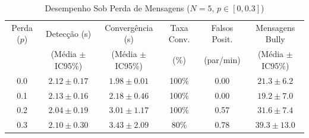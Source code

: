 \begin{table}[htbp]
\caption{Desempenho Sob Perda de Mensagens ($N=5$, $p \in [0, 0.3]$)}
\label{tab:grade_perda}
\centering
\small
\begin{tabular}{@{}cccccc@{}}
\toprule
Perda ($p$) & Detecção (s) & Convergência (s) & Taxa Conv. & Falsos Posit. & Mensagens Bully \\
 & (Média $\pm$ IC95\%) & (Média $\pm$ IC95\%) & (\%) & (par/min) & (Média $\pm$ IC95\%) \\
\midrule
0.0 & $2.12 \pm 0.17$ & $1.98 \pm 0.01$ & 100\% & 0.00 & $21.3 \pm 6.2$ \\
0.1 & $2.13 \pm 0.16$ & $2.18 \pm 0.46$ & 100\% & 0.00 & $19.2 \pm 7.0$ \\
0.2 & $2.04 \pm 0.19$ & $3.01 \pm 1.17$ & 100\% & 0.57 & $31.6 \pm 7.4$ \\
0.3 & $2.10 \pm 0.30$ & $3.43 \pm 2.09$ & 80\% & 0.78 & $39.3 \pm 13.0$ \\
\bottomrule
\end{tabular}
\end{table}
